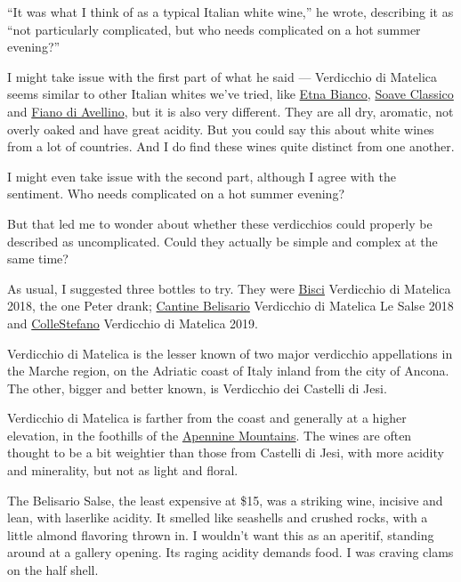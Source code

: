 ``It was what I think of as a typical Italian white wine,'' he wrote,
describing it as ``not particularly complicated, but who needs
complicated on a hot summer evening?''

I might take issue with the first part of what he said --- Verdicchio di
Matelica seems similar to other Italian whites we've tried, like
\href{https://www.nytimes3xbfgragh.onion/2018/04/26/dining/drinks/wine-school-etna-bianco-sicily.html}{Etna
Bianco},
\href{https://www.nytimes3xbfgragh.onion/2019/06/06/dining/drinks/wine-school-soave-classico.html}{Soave
Classico} and
\href{https://www.nytimes3xbfgragh.onion/2018/05/31/dining/drinks/wine-school-fiano.html}{Fiano
di Avellino}, but it is also very different. They are all dry, aromatic,
not overly oaked and have great acidity. But you could say this about
white wines from a lot of countries. And I do find these wines quite
distinct from one another.

I might even take issue with the second part, although I agree with the
sentiment. Who needs complicated on a hot summer evening?

But that led me to wonder about whether these verdicchios could properly
be described as uncomplicated. Could they actually be simple and complex
at the same time?

As usual, I suggested three bottles to try. They were
\href{https://www.bisci.it/en/}{Bisci} Verdicchio di Matelica 2018, the
one Peter drank;
\href{https://portovinoitaliano.com/producers/cantine-belisario/}{Cantine
Belisario} Verdicchio di Matelica Le Salse 2018 and
\href{https://www.collestefano.com/en/}{ColleStefano} Verdicchio di
Matelica 2019.

Verdicchio di Matelica is the lesser known of two major verdicchio
appellations in the Marche region, on the Adriatic coast of Italy inland
from the city of Ancona. The other, bigger and better known, is
Verdicchio dei Castelli di Jesi.

Verdicchio di Matelica is farther from the coast and generally at a
higher elevation, in the foothills of the
\href{https://www.britannica.com/place/Apennine-Range}{Apennine
Mountains}. The wines are often thought to be a bit weightier than those
from Castelli di Jesi, with more acidity and minerality, but not as
light and floral.

The Belisario Salse, the least expensive at \$15, was a striking wine,
incisive and lean, with laserlike acidity. It smelled like seashells and
crushed rocks, with a little almond flavoring thrown in. I wouldn't want
this as an aperitif, standing around at a gallery opening. Its raging
acidity demands food. I was craving clams on the half shell.

